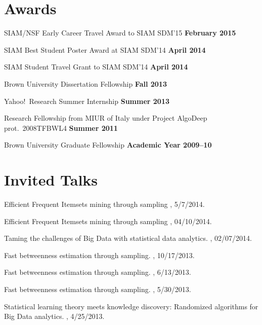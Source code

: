 \documentclass[margin,line]{resume}
\begin{document}

\section{\sc Awards}

SIAM/NSF Early Career Travel Award to SIAM SDM'15 \hfill {\bf February 2015}

SIAM Best Student Poster Award at SIAM SDM'14 \hfill {\bf April 2014}

SIAM Student Travel Grant to SIAM SDM'14 \hfill {\bf April 2014}

Brown University Dissertation Fellowship \hfill {\bf Fall 2013}

Yahoo!~Research Summer Internship \hfill {\bf Summer 2013}

Research Fellowship from MIUR of Italy under Project AlgoDeep prot.~2008TFBWL4
\hfill {\bf Summer 2011}

Brown University Graduate Fellowship \hfill {\bf Academic Year 2009--10}

\section{\sc Invited Talks}

Efficient Frequent Itemsets mining through sampling
, 5/7/2014.

Efficient Frequent Itemsets mining through sampling
,
04/10/2014.

Taming the challenges of Big Data with statistical data analytics.
, 02/07/2014.

Fast betweenness estimation through sampling.
, 10/17/2013.

Fast betweenness estimation through sampling.
, 6/13/2013.

Fast betweenness estimation through sampling.
, 5/30/2013.

Statistical learning theory meets knowledge discovery: Randomized algorithms for
Big Data analytics.
, 4/25/2013.
\end{document}
